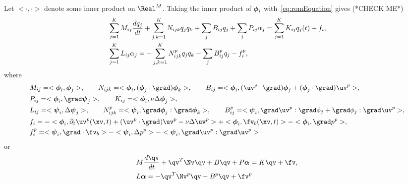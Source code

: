 Let $<\cdot,\cdot>$ denote some inner product on $\Real^M$. 
Taking the inner product of $\boldsymbol{\phi}_i$ with~\eqref{eq:romEquation} gives (*CHECK ME*)
\begin{align}
  &   \sum_{j=1}^K M_{ij} \frac{d q_j}{dt}  + \sum_{j,k=1}^K N_{ijk} q_j q_k + \sum_j B_{ij} q_j 
           + \sum_j P_{ij} \alpha_j =  \sum_{j=1}^K K_{ij} q_j(t)  + f_i, \\
  &   \sum_{j=1}^K L_{ij}  \alpha_j  = - \sum_{j,k=1}^K N^p_{ijk} q_j q_k - \sum_j B^p_{ij} q_j  - f^p_i , 
\end{align}
where 
\begin{align}
&   M_{ij} = <\phiv_i,\phiv_j>, \qquad
  N_{ijk} = <\phiv_i, (\phiv_j\cdot\grad)\phiv_k > , \qquad 
  B_{ij}  = <\phiv_i, (\uv^p\cdot\grad)\phiv_j + (\phiv_j\cdot\grad)\uv^p >, \\
&   P_{ij} = <\phiv_i,\grad\psiv_j> , \qquad
  K_{ij} = <\phiv_i,\nu\Delta \phiv_j>, \\
&   L_{ij} = <\psiv_i,\Delta \psiv_j>, \qquad  
    N^p_{ijk} = <\psiv_i, \grad\phiv_j : \grad\phiv_k > , \qquad B^p_{ij}=<\psiv_i, \grad\uv^p:\grad\phi_j + \grad\phi_j:\grad\uv^p> ,   \\
&  f_i =  - <\phiv_i, \partial_t \uv^p(\xv,t) + (\uv^p\cdot\grad) \uv^p - \nu\Delta\uv^p > + <\phiv_i,\fv_b(\xv,t)> 
          - <\phiv_i,\grad p^p>   , \\
&   f^p_i  = <\psiv_i,\grad\cdot\fv_b> - <\psiv_i,\Delta p^p> - <\psiv_i,\grad\uv^p:\grad\uv^p>
\end{align}
or
\begin{align}
  &  M \frac{d\qv}{dt} + \qv^T \Nv \qv + B \qv + P\qpv = K \qv + \fv , \label{eq:romEquationProjected} \\
  &  L \qpv = - \qv^T \Nv^p \qv - B^p \qv + \fv^p 
\end{align}